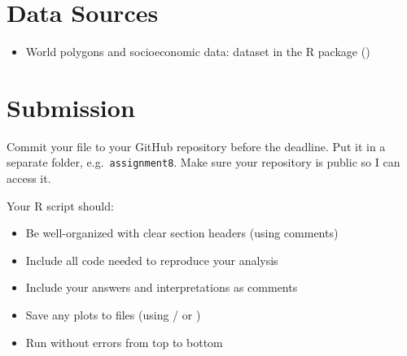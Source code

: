 \vspace{15pt}

\section{Data Sources}

\begin{itemize}
  \item World polygons and socioeconomic data:  dataset in the  R package ()
\end{itemize}

\vspace{15pt}

\section{Submission}

Commit your file to your GitHub repository before the deadline. Put it in a separate folder, e.g.\ \texttt{assignment8}. Make sure your repository is public so I can access it.

Your R script should:
\begin{itemize}
  \item Be well-organized with clear section headers (using comments)
  \item Include all code needed to reproduce your analysis
  \item Include your answers and interpretations as comments
  \item Save any plots to files (using / or )
  \item Run without errors from top to bottom
\end{itemize}


